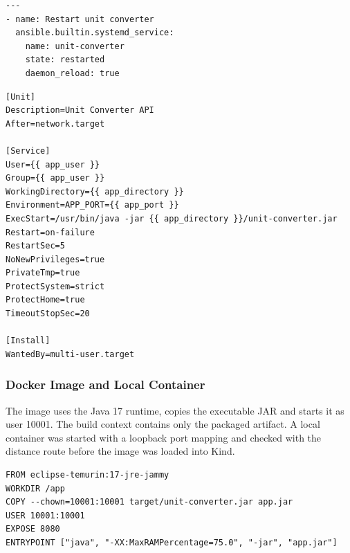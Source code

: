 \documentclass[12pt,a4paper]{article}
\begin{document}
\par\medskip{}\noindent\textbf{}\par\smallskip

\begin{lstlisting}
---
- name: Restart unit converter
  ansible.builtin.systemd_service:
    name: unit-converter
    state: restarted
    daemon_reload: true
\end{lstlisting}

\par\medskip{}\noindent\textbf{}\par\smallskip

\begin{lstlisting}
[Unit]
Description=Unit Converter API
After=network.target

[Service]
User={{ app_user }}
Group={{ app_user }}
WorkingDirectory={{ app_directory }}
Environment=APP_PORT={{ app_port }}
ExecStart=/usr/bin/java -jar {{ app_directory }}/unit-converter.jar
Restart=on-failure
RestartSec=5
NoNewPrivileges=true
PrivateTmp=true
ProtectSystem=strict
ProtectHome=true
TimeoutStopSec=20

[Install]
WantedBy=multi-user.target
\end{lstlisting}

\subsubsection*{Docker Image and Local Container}

The image uses the Java 17 runtime, copies the executable JAR and starts it as user 10001. The build context contains only the packaged artifact. A local container was started with a loopback port mapping and checked with the distance route before the image was loaded into Kind.

\par\medskip{}\noindent\textbf{}\par\smallskip

\begin{lstlisting}
FROM eclipse-temurin:17-jre-jammy
WORKDIR /app
COPY --chown=10001:10001 target/unit-converter.jar app.jar
USER 10001:10001
EXPOSE 8080
ENTRYPOINT ["java", "-XX:MaxRAMPercentage=75.0", "-jar", "app.jar"]
\end{lstlisting}

\par\medskip{}\noindent\textbf{}\par\smallskip
\end{document}
